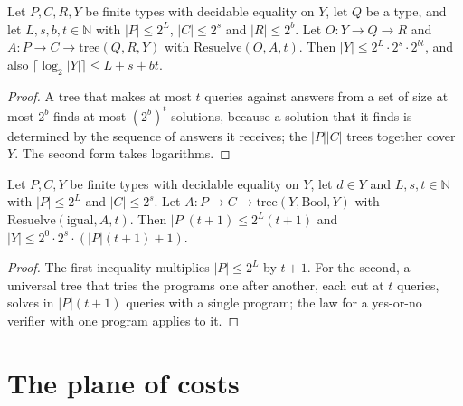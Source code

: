 \begin{theorem}
  \label{thm:information-three-memories}
  \leanok
  Let $P, C, R, Y$ be finite types with decidable equality on $Y$, let $Q$ be a type, and let
  $L, s, b, t \in \mathbb{N}$ with $|P| \le 2^L$, $|C| \le 2^s$ and $|R| \le 2^b$. Let
  $O : Y \to Q \to R$ and $A : P \to C \to \text{tree}(Q, R, Y)$ with $\mathrm{Resuelve}(O, A, t)$.
  Then $|Y| \le 2^L \cdot 2^s \cdot 2^{b t}$, and also
  $\lceil \log_2 |Y| \rceil \le L + s + b t$.
  \own{}
\end{theorem}

\begin{proof}
  \leanok
  A tree that makes at most $t$ queries against answers from a set of size at most $2^b$ finds at
  most $(2^b)^t$ solutions, because a solution that it finds is determined by the sequence of
  answers it receives; the $|P||C|$ trees together cover $Y$. The second form takes logarithms.
\end{proof}

\begin{theorem}
  \label{thm:information-levin-box}
  \leanok
  Let $P, C, Y$ be finite types with decidable equality on $Y$, let $d \in Y$ and
  $L, s, t \in \mathbb{N}$ with $|P| \le 2^L$ and $|C| \le 2^s$. Let
  $A : P \to C \to \text{tree}(Y, \mathrm{Bool}, Y)$ with $\mathrm{Resuelve}(\mathrm{igual}, A, t)$.
  Then $|P|(t + 1) \le 2^L (t + 1)$ and
  $|Y| \le 2^0 \cdot 2^s \cdot (|P|(t + 1) + 1)$.
  \own{}
\end{theorem}

\begin{proof}
  \leanok
  The first inequality multiplies $|P| \le 2^L$ by $t + 1$. For the second, a universal tree that
  tries the programs one after another, each cut at $t$ queries, solves in $|P|(t+1)$ queries with a
  single program; the law for a yes-or-no verifier with one program applies to it.
\end{proof}

\section{The plane of costs}
\label{sec:information-cost-plane}

